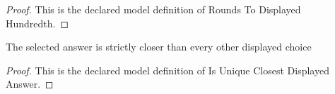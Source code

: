 \begin{proof}
  This is the declared model definition of Rounds To Displayed Hundredth.
\end{proof}
\begin{definition}
  \label{def:physics:phyx-mini-0353:phyxminiproblems-problemphyxmini0353-isuniqueclosestdisplayedanswer}
  The selected answer is strictly closer than every other displayed choice
\end{definition}
\begin{proof}
  This is the declared model definition of Is Unique Closest Displayed Answer.
\end{proof}
